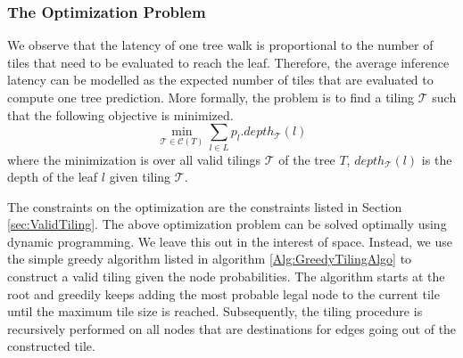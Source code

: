 \subsubsection{The Optimization Problem}


We observe that the latency of one tree walk is proportional to the number of tiles that need to be evaluated to reach the leaf.
Therefore, the average inference latency can be modelled as the expected number of tiles that are evaluated to compute one tree prediction. More formally, the problem is to find a tiling $\mathcal{T}$ such that the following objective is minimized.
\[
    \min_{\mathcal{T} \in \mathcal{C}(T)}{\sum_{l \in L} p_l.depth_{\mathcal{T}}(l)}
\]
where the minimization is over all valid tilings $\mathcal{T}$ of the tree $T$, $depth_{\mathcal{T}}(l)$ is the depth of the leaf $l$ given tiling ${\mathcal{T}}$.

The constraints on the optimization are the constraints listed in Section \ref{sec:ValidTiling}. 
The above optimization problem can be solved optimally using dynamic programming. We leave this out in the interest of space. 
Instead, we use the simple greedy algorithm listed in algorithm \ref{Alg:GreedyTilingAlgo} to construct a valid tiling given the node probabilities.
The algorithm starts at the root and greedily keeps adding the most probable legal node to the current tile until the maximum tile size is reached.
Subsequently, the tiling procedure is recursively performed on all nodes that are destinations for edges going out of the constructed tile.






